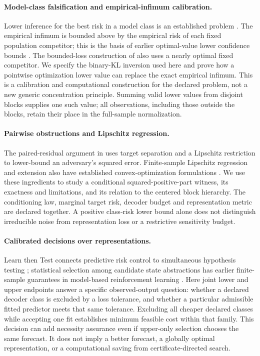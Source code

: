 \paragraph{Model-class falsification and empirical-infimum calibration.}
Lower inference for the best risk in a model class is an established
problem \citep{muller2025falsification}. The empirical infimum is bounded
above by the empirical risk of each fixed population competitor; this is
the basis of earlier optimal-value lower confidence bounds
\citep[Appendix A.2, equations (A10)--(A11)]{guigues2017confidence}.
The bounded-loss construction of \citet[Appendix A.1]{muller2025falsification}
also uses a nearly optimal fixed competitor. We specify the binary-KL
inversion used here and prove how a pointwise optimization lower value can
replace the exact empirical infimum. This is a calibration and computational
construction for the declared problem, not a new generic concentration
principle. Summing valid lower values from disjoint blocks supplies one such
value; all observations, including those outside the blocks, retain their
place in the full-sample normalization.

\paragraph{Pairwise obstructions and Lipschitz regression.}
The paired-residual argument in \citet[Lemma~2]{akash2021inverse}
uses target separation and a Lipschitz restriction to lower-bound an
adversary's squared error. Finite-sample Lipschitz regression and extension
also have established convex-optimization formulations
\citep{gottlieb2017regression}. We use these ingredients to study a
conditional squared-positive-part witness, its exactness and limitations,
and its relation to the centered block hierarchy. The conditioning law,
marginal target risk, decoder budget and representation metric are declared
together. A positive class-risk lower bound alone does not distinguish
irreducible noise from representation loss or a restrictive sensitivity
budget.

\paragraph{Calibrated decisions over representations.}
Learn then Test connects predictive risk control to simultaneous hypothesis
testing \citep{angelopoulos2025ltt}; statistical selection among candidate
state abstractions has earlier finite-sample guarantees in model-based
reinforcement learning \citep{jiang2015abstraction}. Here joint lower and
upper endpoints answer a specific observed-output question: whether a
declared decoder class is excluded by a loss tolerance, and whether a
particular admissible fitted predictor meets that same tolerance.
Excluding all cheaper declared classes while accepting one fit establishes
minimum feasible cost within that family. This decision can add necessity
assurance even if upper-only selection chooses the same forecast. It does
not imply a better forecast, a globally optimal representation, or a
computational saving from certificate-directed search.

